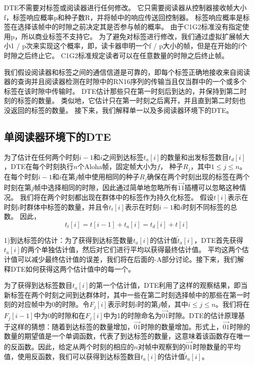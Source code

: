 \documentclass[UTF8]{ctexart}
\newcommand{\RNum}[1]{\uppercase\expandafter{\romannumeral #1\relax}}
\begin{document}
	DTE不需要对标签或阅读器进行任何修改。 它只需要阅读器从控制器接收帧大小f，标签响应概率p和种子数R，并将帧中的响应传送回控制器。 标签响应概率是标签在选择该帧中的时隙之前决定其是否参与帧的概率。 由于C1G2标准没有指定使用p，所以商业标签不支持它。 为了避免对标签进行修改，我们通过虚拟扩展帧大小1 / p次来实现这个概率，即，读卡器申明一个f / p大小的帧，但是在开始的f个时隙之后终止它。 C1G2标准规定读者可以在任意数量的时隙之后终止帧。
	
	我们假设阅读器和标签之间的通信信道是可靠的，即每个标签正确地接收来自阅读器的查询并且阅读器检测在时隙中的RN16序列的传输当且仅当群中的一个或多个标签在该时隙中传输时。 DTE估计那些只在第一时刻后到达的，并保持到第二时刻的标签的数量。 类似地，它估计只在第一时刻之后离开，并且直到第二时刻也没返回的标签的数量。 接下来，我们解释单一以及多阅读器环境下的DTE。
	
	\subsection{单阅读器环境下的DTE}
	为了估计在任何两个时刻$i-1$和$i$之间到达标签$t_a[i]$的数量和出发标签数目$t_d[i]$，DTE在每个时刻执行$n$个Aloha帧，固定帧大小为$f$， 种子$R_j$，其中$1\leq j\leq n$。 在每个时刻$i-1$和$i$在第$j$帧中使用相同的种子$R_j$确保在两个时刻出现的标签在两个时刻在第$j$帧中选择相同的时隙，因此通过简单地忽略所有$\overrightarrow{11}$插槽可以忽略这种情况。 我们将在两个时刻都出现在群体中的标签作为持久化标签。 假设$t[i]$表示在时刻$i$时群体中标签的数量，并且令$t_t[i]$表示在时刻$i-1$和$i$时刻不同标签的总数。 因此，
	\begin{equation}
	t_t[i]=t[i-1]+t_a[i]=t_d[i]+t[i]
	\end{equation}
	
	1)到达标签的估计：为了获得到达标签数量$t_a[i]$的估计值$\widetilde{t}_a[i]$，DTE首先获得$t_a[i]$的两个单独估计值，然后对它们进行平均以获得最终估计值。 平均这两个估计值可以减少最终估计值的误差，我们将在后面的\RNum{4}-A部分讨论。接下来，我们解释DTE如何获得这两个估计值中的每一个。
	
	为了获得到达标签数目$t_a[i]$的第一个估计值，DTE利用了这样的观察结果，即当新标签在两个时刻之间到达群体时，其中一些在第二时刻选择帧中的那些在第一时刻的对应帧中为0的时隙。令$F_j[i]$表示时刻$i$时的第$j$帧，其中$i\leq j\leq n$。我们将在$F_j[i-1]$中为$0$的时隙和在$F_j[i]$中为1的时隙命名为$\overrightarrow{01}$时隙。DTE的估计原理基于这样的猜想：随着到达标签的数量增加，$\overrightarrow{01}$时隙的数量增加。形式上，$\overrightarrow{01}$时隙的数量的期望值是一个单调函数，代表了到达标签的数量，这意味着该函数存在唯一的反函数。因此，给定从两个时刻的相应的$n$对帧中观察到的$\overrightarrow{01}$时隙数量的平均值，使用反函数，我们可以获得到达标签数目$t_a[i]$的估计值$\widetilde{t}_a[i]$。
	
\end{document}
